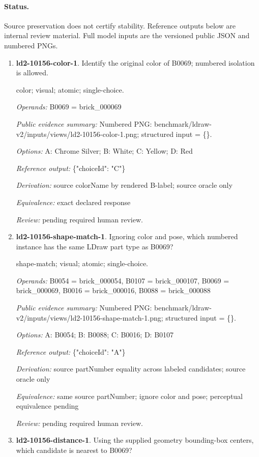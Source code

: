 \paragraph{Status.}Source preservation does not certify stability. Reference outputs below are internal review material. Full model inputs are the versioned public JSON and numbered PNGs.
\begin{enumerate}
\item \textbf{ld2-10156-color-1}. Identify the original color of B0069; numbered isolation is allowed.
\par{\small color; visual; atomic; single-choice.\par\textit{Operands:} B0069 = brick\_000069\par\textit{Public evidence summary:} Numbered PNG: benchmark/ldraw-v2/inputs/views/ld2-10156-color-1.png; structured input = \{\}.\par\textit{Options:} A: Chrome Silver; B: White; C: Yellow; D: Red\par\textit{Reference output:} \{"choiceId": "C"\}\par\textit{Derivation:} source colorName by rendered B-label; source oracle only\par\textit{Equivalence:} exact declared response\par\textit{Review:} pending required human review.}
\item \textbf{ld2-10156-shape-match-1}. Ignoring color and pose, which numbered instance has the same LDraw part type as B0069?
\par{\small shape-match; visual; atomic; single-choice.\par\textit{Operands:} B0054 = brick\_000054, B0107 = brick\_000107, B0069 = brick\_000069, B0016 = brick\_000016, B0088 = brick\_000088\par\textit{Public evidence summary:} Numbered PNG: benchmark/ldraw-v2/inputs/views/ld2-10156-shape-match-1.png; structured input = \{\}.\par\textit{Options:} A: B0054; B: B0088; C: B0016; D: B0107\par\textit{Reference output:} \{"choiceId": "A"\}\par\textit{Derivation:} source partNumber equality across labeled candidates; source oracle only\par\textit{Equivalence:} same source partNumber; ignore color and pose; perceptual equivalence pending\par\textit{Review:} pending required human review.}
\item \textbf{ld2-10156-distance-1}. Using the supplied geometry bounding-box centers, which candidate is nearest to B0069?

\end{enumerate}
